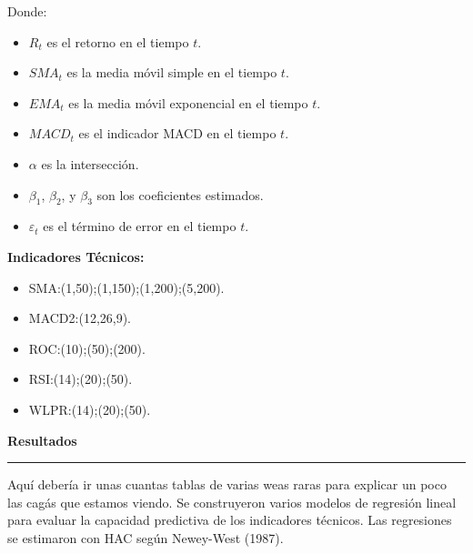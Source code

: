 \documentclass[a0,portrait]{a0poster}
\newcommand{\customsection}[1]{
    \begin{center}
        \vspace{1cm} %
        \color{black}
        \textbf{\Huge #1}
        \color{miRojo}
        \vspace{.5cm} %
        \hrule height 2.5pt  %
        \vspace{.5cm} %
    \end{center}
}
\begin{document}
\begin{multicols}{2}
    Donde:
    \begin{itemize}
        \item $R_t$ es el retorno en el tiempo $t$.
        \item $SMA_t$ es la media móvil simple en el tiempo $t$.
        \item $EMA_t$ es la media móvil exponencial en el tiempo $t$.
        \item $MACD_t$ es el indicador MACD en el tiempo $t$.
        \item $\alpha$ es la intersección.
        \item $\beta_1$, $\beta_2$, y $\beta_3$ son los coeficientes estimados.
        \item $\varepsilon_t$ es el término de error en el tiempo $t$.
    \end{itemize}
    \par
    \textbf{Indicadores Técnicos:}
    \begin{itemize}
        \item SMA:(1,50);(1,150);(1,200);(5,200).
        \item MACD2:(12,26,9).
        \item ROC:(10);(50);(200).
        \item RSI:(14);(20);(50).
        \item WLPR:(14);(20);(50).
    \end{itemize}
    \customsection{Resultados}
    \par  
    Aquí debería ir unas cuantas tablas de varias weas raras para explicar un poco las cagás que estamos viendo.
    Se construyeron varios modelos de regresión lineal para evaluar la capacidad predictiva de los indicadores técnicos. Las regresiones se estimaron con HAC según Newey-West (1987).
    


\end{multicols}
\end{document}
